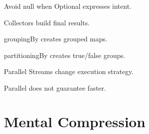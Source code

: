 \documentclass[11pt,a4paper]{book}
\begin{document}

\begin{rosettarule}

Avoid null when Optional expresses intent.

\end{rosettarule}


\begin{rosettarule}

Collectors build final results.

\end{rosettarule}


\begin{rosettarule}

groupingBy creates grouped maps.

\end{rosettarule}


\begin{rosettarule}

partitioningBy creates true/false groups.

\end{rosettarule}


\begin{rosettarule}

Parallel Streams change execution strategy.

\end{rosettarule}


\begin{rosettarule}

Parallel does not guarantee faster.

\end{rosettarule}


\section{Mental Compression}
\end{document}
